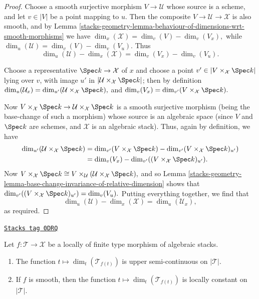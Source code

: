 \begin{proof}
Choose a smooth surjective morphism $V \to \mathcal{U}$ whose source
is a scheme, and let $v\in |V|$ be a point mapping to $u$.
Then the composite $V \to \mathcal{U} \to \mathcal{X}$ is also smooth,
and by Lemma \ref{stacks-geometry-lemma-behaviour-of-dimensions-wrt-smooth-morphisms}
we have $\dim_x(\mathcal{X}) = \dim_v(V) - \dim_v(V_x),$
while $\dim_u(\mathcal{U}) = \dim_v(V) - \dim_v(V_u).$
Thus
$$
\dim_u(\mathcal{U}) - \dim_x(\mathcal{X}) = \dim_v (V_x) - \dim_v (V_u).
$$

\medskip\noindent
Choose a representative $\Spec k \to \mathcal{X}$ of $x$
and choose a point $v' \in | V \times_{\mathcal{X}} \Spec k|$ lying over
$v$, with image $u'$ in $|\mathcal{U}\times_{\mathcal{X}} \Spec k|$;
then by definition
$\dim_u(\mathcal{U}_x) = \dim_{u'}(\mathcal{U}\times_{\mathcal{X}} \Spec k),$
and
$\dim_v(V_x) = \dim_{v'}(V\times_{\mathcal{X}} \Spec k).$

\medskip\noindent
Now $V\times_{\mathcal{X}} \Spec k \to \mathcal{U}\times_{\mathcal{X}}\Spec k$
is a smooth surjective morphism (being the base-change
of such a morphism) whose source is an algebraic space
(since $V$ and $\Spec k$ are schemes, and $\mathcal{X}$
is an algebraic stack).  Thus, again by definition,
we have
\begin{align*}
\dim_{u'}(\mathcal{U}\times_{\mathcal{X}} \Spec k)
& =
\dim_{v'}(V\times_{\mathcal{X}} \Spec k) -
\dim_{v'}(V \times_{\mathcal{X}} \Spec k)_{u'}) \\
& = \dim_v(V_x) -
\dim_{v'}( (V\times_{\mathcal{X}} \Spec k)_{u'}).
\end{align*}
Now $V\times_{\mathcal{X}} \Spec k \cong
V\times_{\mathcal{U}} (\mathcal{U}\times_{\mathcal{X}} \Spec k),$
and so
Lemma \ref{stacks-geometry-lemma-base-change-invariance-of-relative-dimension}
shows that
$\dim_{v'}((V\times_{\mathcal{X}} \Spec k)_{u'})  = \dim_v(V_u).$
Putting everything together, we find that
$$
\dim_u(\mathcal{U}) - \dim_x(\mathcal{X}) =
\dim_u(\mathcal{U}_x),
$$
as required.
\end{proof}

\begin{lemma}
\label{stacks-geometry-lemma-relative-dimension-is-semi-continuous}
\href{https://stacks.math.columbia.edu/tag/0DRQ}{\texttt{Stacks tag 0DRQ}}

Let $f: \mathcal{T} \to \mathcal{X}$ be a locally of finite type morphism of
algebraic stacks.
\begin{enumerate}
\item
The function $t \mapsto \dim_t(\mathcal{T}_{f(t)})$ is upper semi-continuous
on $|\mathcal{T}|$.
\item If $f$ is smooth, then
the function $t \mapsto \dim_t(\mathcal{T}_{f(t)})$ is locally constant
on $|\mathcal{T}|$.
\end{enumerate}
\end{lemma}

